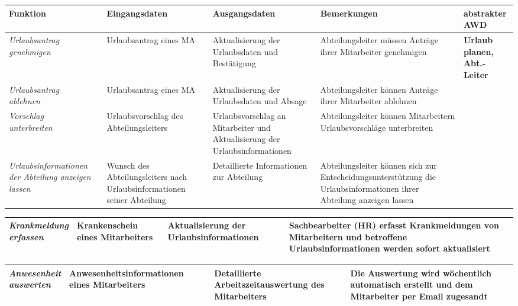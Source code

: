 {
\hspace{-3,5cm}
\footnotesize
\begin{tabular}{|p{3cm}|p{4cm}|p{4cm}|p{4cm}|p{2cm}|}
	\hline 
		\textbf{Funktion	} &	
		\textbf{Eingangsdaten} &
		\textbf{Ausgangsdaten}& 
		\textbf{Bemerkungen}	&
		\textbf{abstrakter AWD} \\
	\hline \hline 
		\textit{Urlaubsantrag \newline genehmigen} &
		Urlaubsantrag eines MA &
		Aktualisierung der Urlaubsdaten und Best\"atigung &
		Abteilungsleiter m\"ussen Antr\"age ihrer Mitarbeiter genehmigen &
		\textbf{Urlaub \newline planen, \newline  Abt.-Leiter } \\
	\cline{1-4}
		\textit{Urlaubsantrag \newline ablehnen} &
		Urlaubsantrag eines MA &
		Aktualisierung der Urlaubsdaten und Absage&
		Abteilungsleiter k\"onnen Antr\"age ihrer Mitarbeiter ablehnen &
		\\
	\cline{1-4}
		\textit{Vorschlag \newline unterbreiten} &
		Urlaubsvorschlag des Abteilungsleiters &
		Urlaubsvorschlag an Mitarbeiter und Aktualisierung der Urlaubsinformationen &
		Abteilungsleiter k\"onnen Mitarbeitern Urlaubsvorschl\"age unterbreiten &
		\\
	\cline{1-4}
		\textit{Urlaubsinformationen der Abteilung an\-zeigen lassen} &
		Wunsch des Abteilungsleiters nach Urlaubsinformationen seiner Abteilung &
		Detaillierte Informationen zur Abteilung &
		Abteilungsleiter k\"onnen sich zur Entscheidungs\-unterst\"utzung die Urlaubs\-informationen ihrer Abteilung anzeigen lassen &
		\\
	\hline
\end{tabular}
}

{
\vspace{0,5cm}
\hspace{-3,5cm}
\footnotesize
\begin{tabular}{|p{3cm}|p{4cm}|p{4cm}|p{4cm}|p{2cm}|}
	\hline 
		\textit{Krankmeldung \newline erfassen} &
		Krankenschein eines Mitarbeiters &
		Aktualisierung der Urlaubsinformationen &
		Sachbearbeiter (HR) erfasst Krankmeldungen von Mitarbeitern und betroffene Urlaubsinformationen werden sofort aktualisiert &
		 \\
	\hline	
\end{tabular}
}

{
\vspace{0,5cm}
\hspace{-3,5cm}
\footnotesize
\begin{tabular}{|p{3cm}|p{4cm}|p{4cm}|p{4cm}|p{2cm}|}
	\hline 
		\textit{Anwesenheit \newline auswerten} &
		Anwesenheitsinformationen eines Mitarbeiters &
		Detaillierte Arbeitszeit\-aus\-wertung  des Mitarbeiters &
		Die Auswertung wird w\"ochentlich automatisch erstellt und dem Mitarbeiter per Email zugesandt &
		 \\
	\hline	
\end{tabular}
}

